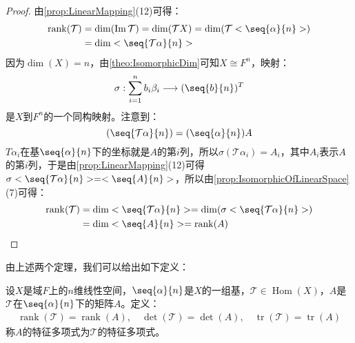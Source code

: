 \begin{proof}
	由\cref{prop:LinearMapping}(12)可得：
	\begin{align*}
		\operatorname{rank}(\mathcal{T})&=\dim(\operatorname{Im}\mathcal{T})=\dim(\mathcal{T}X)=\dim(\mathcal{T}<\seq{\alpha}{n}>) \\
		&=\dim<\seq{\mathcal{T}\alpha}{n}>
	\end{align*}
	因为$\dim(X)=n$，由\cref{theo:IsomorphicDim}可知$X\cong F^n$，映射：
	\begin{equation*}
		\sigma:\sum_{i=1}^{n}b_i\beta_i\longrightarrow(\seq{b}{n})^T
	\end{equation*}
	是$X$到$F^n$的一个同构映射。注意到：
	\begin{equation*}
		(\seq{\mathcal{T}\alpha}{n})=(\seq{\alpha}{n})A
	\end{equation*}
	$T\alpha_i$在基$\seq{\alpha}{n}$下的坐标就是$A$的第$i$列，所以$\sigma(\mathcal{T}\alpha_i)=A_i$，其中$A_i$表示$A$的第$i$列，于是由\cref{prop:LinearMapping}(12)可得$\sigma<\seq{\mathcal{T}\alpha}{n}>=<\seq{A}{n}>$，所以由\cref{prop:IsomorphicOfLinearSpace}(7)可得：
	\begin{align*}
		\operatorname{rank}(\mathcal{T})&=\dim<\seq{\mathcal{T}\alpha}{n}>=\dim(\sigma<\seq{\mathcal{T}\alpha}{n}>) \\
		&=\dim<\seq{A}{n}>=\operatorname{rank}(A)\qedhere
	\end{align*}
\end{proof}
由上述两个定理，我们可以给出如下定义：
\begin{definition}
	设$X$是域$F$上的$n$维线性空间，$\seq{\alpha}{n}$是$X$的一组基，$\mathcal{T}\in\operatorname{Hom}(X)$，$A$是$\mathcal{T}$在$\seq{\alpha}{n}$下的矩阵$A$。定义：
	\begin{gather*}
		\operatorname{rank}(\mathcal{T})=\operatorname{rank}(A),\quad\det(\mathcal{T})=\det(A),\quad\operatorname{tr}(\mathcal{T})=\operatorname{tr}(A)
	\end{gather*}
	称$A$的特征多项式为$\mathcal{T}$的特征多项式。
\end{definition}

